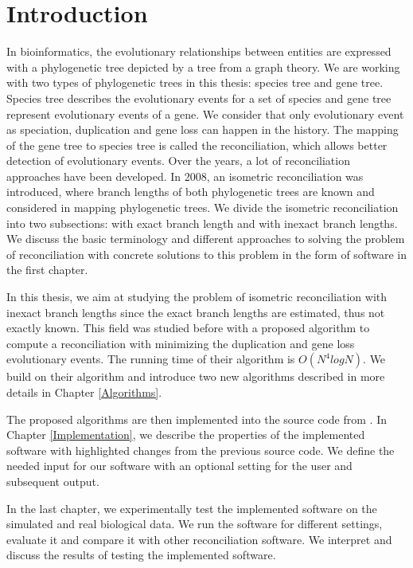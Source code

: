 \chapter*{Introduction}

In bioinformatics, the evolutionary relationships between entities are expressed with a phylogenetic tree depicted by a tree from a graph theory. We are working with two types of phylogenetic trees in this thesis: species tree and gene tree. Species tree describes the evolutionary events for a set of species and gene tree represent evolutionary events of a gene. We consider that only evolutionary event as speciation, duplication and gene loss can happen in the history. The mapping of the gene tree to species tree is called the reconciliation, which allows better detection of evolutionary events. Over the years, a lot of reconciliation approaches have been developed. In 2008, an isometric reconciliation was introduced, where branch lengths of both phylogenetic trees are known and considered in mapping phylogenetic trees. We divide the isometric reconciliation into two subsections: with exact branch length and with inexact branch lengths. We discuss the basic terminology and different approaches to solving the problem of reconciliation with concrete solutions to this problem in the form of software in the first chapter.

In this thesis, we aim at studying the problem of isometric reconciliation with inexact branch lengths since the exact branch lengths are estimated, thus not exactly known. This field was studied before \cite{chladek_thesis} with a proposed algorithm to compute a reconciliation with minimizing the duplication and gene loss evolutionary events. The running time of their algorithm is $O(N^4 log N)$. We build on their algorithm and introduce two new algorithms described in more details in Chapter \ref{Algorithms}.

The proposed algorithms are then implemented into the source code from \cite{chladek_thesis}. In Chapter \ref{Implementation}, we describe the properties of the implemented software with highlighted changes from the previous source code. We define the needed input for our software with an optional setting for the user and subsequent output.

In the last chapter, we experimentally test the implemented software on the simulated and real biological data. We run the software for different settings, evaluate it and compare it with other reconciliation software. We interpret and discuss the results of testing the implemented software.
